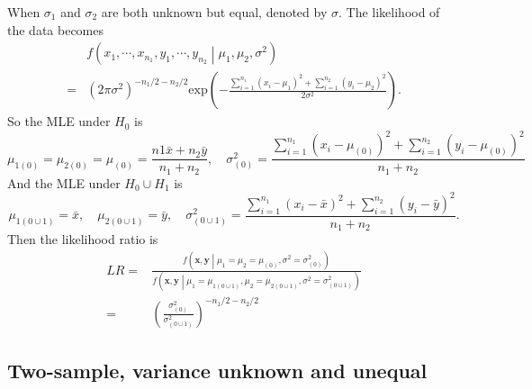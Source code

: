 \documentclass[a4paper,12pt]{article}
\begin{document}
When $\sigma_1$ and $\sigma_2$ are both unknown but equal, denoted by $\sigma$. The likelihood of the data becomes
\[
  \begin{aligned}
    & f\left(
      x_1, \cdots, x_{n_1}, y_1, \cdots, y_{n_2}
      \middle|
      \mu_1, \mu_2, \sigma^2
      \right)    \\
    = & \left(
        2\pi\sigma^2
        \right)^{-n_1 / 2 - n_2 / 2}
        \mathrm{exp}\left(
        -\frac{
        \sum\limits_{i = 1}^{n_1}\left(x_i - \mu_1\right)^2
        + \sum\limits_{i = 1}^{n_2}\left(y_i - \mu_2\right)^2
        }{
        2\sigma^2
        }
        \right)
        .
  \end{aligned}
\]
So the MLE under $H_0$ is
\[
  \mu_{1\left(0\right)} = \mu_{2\left(0\right)} = \mu_{\left(0\right)} = \frac{n1\bar{x} + n_2\bar{y}}{n_1 + n_2}
  ,\quad
  \sigma^2_{\left(0\right)} = \frac{
    \sum\limits_{i = 1}^{n_1}\left(x_i - \mu_{\left(0\right)}\right)^2
    + \sum\limits_{i = 1}^{n_2}\left(y_i  - \mu_{\left(0\right)}\right)^2
  }{
    n_1 + n_2
  }
\]
And the MLE under $H_0\cup H_1$ is
\[
  \mu_{1\left(0\cup1\right)} = \bar{x},\quad \mu_{2\left(0\cup1\right)} = \bar{y}
  ,\quad
  \sigma^2_{\left(0\cup1\right)} =
  \frac{
    \sum\limits_{i = 1}^{n_1}\left(x_i - \bar{x}\right)^2
    + \sum\limits_{i = 1}^{n_2}\left(y_i - \bar{y}\right)^2
  }{
    n_1 + n_2
  }
  .
\]
Then the likelihood ratio is
\[
  \begin{aligned}
    LR =& \frac{
          f\left(\bm{x}, \bm{y}\middle|\mu_1 = \mu_2 = \mu_{\left(0\right)}, \sigma^2 = \sigma_{\left(0\right)}^2\right)
          }{
          f\left(\bm{x}, \bm{y}\middle|
          \mu_1 = \mu_{1\left(0\cup1\right)},
          \mu_2 = \mu_{2\left(0\cup1\right)},
          \sigma^2 = \sigma_{\left(0\cup1\right)}^2\right)
          }    \\
    =& \left(
       \frac{\sigma_{\left(0\right)}^2}{\sigma_{\left(0\cup1\right)}^2}
       \right)^{-n_1 / 2 - n_2 / 2}
  \end{aligned}
\]

\subsection{Two-sample, variance unknown and unequal}
\label{sec:two-sample-variance-2}
\end{document}
